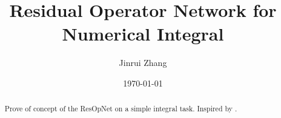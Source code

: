 \documentclass{article}
\title{Residual Operator Network for Numerical Integral}
\author{Jinrui Zhang}
\date{\today}
\begin{document}
\maketitle

\begin{abstract}
    Prove of concept of the ResOpNet
    on a simple integral task.
    Inspired by \cite[ResNet]{ResNet}.
\end{abstract}

\tableofcontents
\newpage


\end{document}
